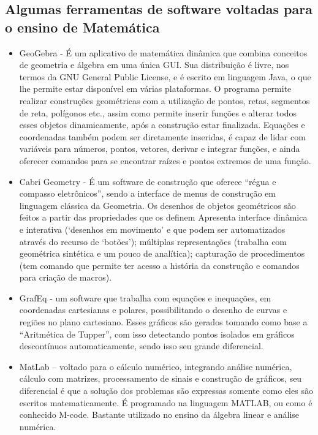 \documentclass[12pt,a4paper]{article}
\begin{document}
\subsection{Algumas ferramentas de software voltadas para o ensino de Matemática} 
\begin{itemize}
\item GeoGebra - É um aplicativo de matemática dinâmica que combina conceitos de geometria e álgebra em uma única GUI. Sua distribuição é livre, nos termos da GNU General Public License, e é escrito em linguagem Java, o que lhe permite estar disponível em várias plataformas. O programa permite realizar construções geométricas com a utilização de pontos, retas, segmentos de reta, polígonos etc., assim como permite inserir funções e alterar todos esses objetos dinamicamente, após a construção estar finalizada. Equações e coordenadas também podem ser diretamente inseridas, é capaz de lidar com variáveis para números, pontos, vetores, derivar e integrar funções, e ainda oferecer comandos para se encontrar raízes e pontos extremos de uma função.

\item Cabri Geometry - É um software de construção que oferece “régua e compasso eletrônicos”, sendo a interface de menus de construção em linguagem clássica da Geometria. Os desenhos de objetos geométricos são feitos a partir das propriedades que os definem Apresenta interface dinâmica e interativa (‘desenhos em movimento’ e que podem ser automatizados através do recurso de ‘botões’); múltiplas representações (trabalha com geométrica sintética e um pouco de analítica); capturação de procedimentos (tem comando que permite ter acesso a história da construção e comandos para criação de macros).

\item GrafEq - um software que trabalha com equações e inequações, em coordenadas cartesianas e polares, possibilitando o desenho de curvas e regiões no plano cartesiano. Esses gráficos são gerados tomando como base a “Aritmética de Tupper”, com isso detectando pontos isolados em gráficos descontínuos automaticamente, sendo isso seu grande diferencial.

\item MatLab – voltado para o cálculo numérico, integrando análise numérica, cálculo com matrizes, processamento de sinais e construção de gráficos, seu diferencial é que a solução dos problemas são expressas somente como eles são escritos matematicamente. É programado na linguagem MATLAB, ou como é conhecido M-code. Bastante utilizado no ensino da álgebra linear e análise numérica.


\end{itemize}
\end{document}
